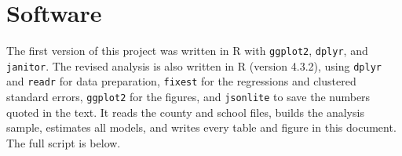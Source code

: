 \documentclass[12pt,letterpaper]{report}
\begin{document}
\appendix
\chapter{Software}
The first version of this project was written in R with \texttt{ggplot2}, \texttt{dplyr},
and \texttt{janitor}. The revised analysis is also written in R (version 4.3.2), using \texttt{dplyr} and
\texttt{readr} for data preparation, \texttt{fixest} for the regressions and clustered
standard errors, \texttt{ggplot2} for the figures, and \texttt{jsonlite} to save the numbers
quoted in the text. It reads the county and school files,
builds the analysis sample, estimates all models, and writes every table and figure in this
document. The full script is below.


\end{document}
